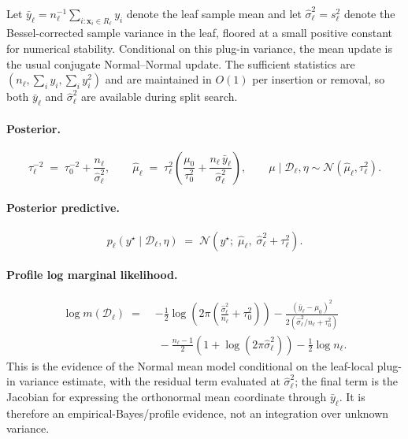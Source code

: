 \documentclass[10pt]{article} %
\begin{document}
Let $\bar{y}_\ell = n_\ell^{-1}\sum_{i:\mathbf{x}_i\in R_\ell} y_i$ denote the leaf sample mean and let $\hat\sigma_\ell^2=s_\ell^2$ denote the Bessel-corrected sample variance in the leaf, floored at a small positive constant for numerical stability. Conditional on this plug-in variance, the mean update is the usual conjugate Normal--Normal update. The sufficient statistics are $(n_\ell, \sum_i y_i, \sum_i y_i^2)$ and are maintained in $O(1)$ per insertion or removal, so both $\bar y_\ell$ and $\hat\sigma_\ell^2$ are available during split search.

\paragraph{Posterior.}
\begin{equation}\label{eq:normal_posterior}
\tau_\ell^{-2} \;=\; \tau_0^{-2} + \frac{n_\ell}{\hat\sigma_\ell^2},
\qquad
\hat{\mu}_\ell \;=\; \tau_\ell^{2}\!\left(\frac{\mu_0}{\tau_0^2} + \frac{n_\ell\,\bar{y}_\ell}{\hat\sigma_\ell^2}\right),
\qquad
\mu \mid \mathcal{D}_\ell,\eta \sim \mathcal{N}(\hat{\mu}_\ell,\tau_\ell^2).
\end{equation}

\paragraph{Posterior predictive.}
\begin{equation}\label{eq:normal_predictive}
p_\ell(y^\star \mid \mathcal{D}_\ell,\eta) \;=\; \mathcal{N}\!\left(y^\star;\; \hat{\mu}_\ell,\; \hat\sigma_\ell^2 + \tau_\ell^2\right).
\end{equation}

\paragraph{Profile log marginal likelihood.}
\begin{equation}\label{eq:normal_log_marginal}
\begin{aligned}
\log m(\mathcal{D}_\ell)
\;=\;& -\frac{1}{2}\log\!\left(2\pi\left(\frac{\hat\sigma_\ell^2}{n_\ell}+\tau_0^2\right)\right)
-\frac{(\bar y_\ell-\mu_0)^2}{2(\hat\sigma_\ell^2/n_\ell+\tau_0^2)} \\
&\;-\frac{n_\ell-1}{2}\left(1+\log(2\pi\hat\sigma_\ell^2)\right)
-\frac{1}{2}\log n_\ell.
\end{aligned}
\end{equation}
This is the evidence of the Normal mean model conditional on the leaf-local plug-in variance estimate, with the residual term evaluated at $\hat\sigma_\ell^2$; the final term is the Jacobian for expressing the orthonormal mean coordinate through $\bar y_\ell$. It is therefore an empirical-Bayes/profile evidence, not an integration over unknown variance.
\end{document}
